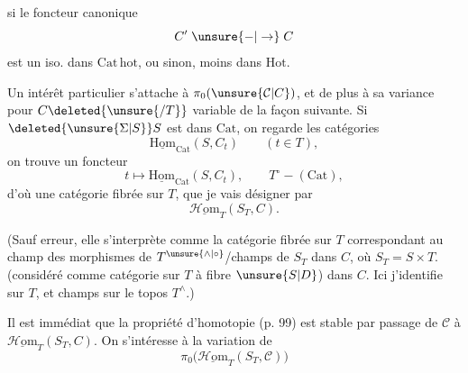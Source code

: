 
si le foncteur canonique
\[
C'\mathrel{\unsure{-|\to}}C
\]
est  un iso. dans $\mathrm{Cat\,hot}$, ou sinon,  moins dans $\mathrm{Hot}$.

Un intérêt particulier s'attache à $\pi_0(\unsure{\mathcal C|C})$, et de plus à sa variance pour $C\deleted{\unsure{/T}}$  variable de la façon suivante. Si $\deleted{\unsure{\Sigma|S}}S$ est dans $\mathrm{Cat}$, on regarde les catégories
\[
\underline{\mathrm{Hom}}_{\mathrm{Cat}}(S,C_t)\qquad(t\in T),
\]
on trouve un foncteur
\[
t\longmapsto\underline{\mathrm{Hom}}_{\mathrm{Cat}}(S,C_t),\qquad T^\circ\mathrel{-}(\mathrm{Cat}),
\]
d'où une catégorie fibrée sur $T$, que je vais désigner par
\[
\underline{\mathscr H\mathrm{om}}_T(S_T,C).
\]

(Sauf erreur, elle s'interprète comme la catégorie fibrée sur $T$ correspondant au champ  des morphismes de $T^{\unsure{\wedge|\circ}}$/champs de $S_T$ dans $C$, où $S_T=S\times T$. (considéré comme catégorie  sur $T$ à fibre   $\unsure{S|D}$) dans $C$. Ici j'identifie  sur $T$, et champs sur le topos $T^\wedge$.)

Il est immédiat que  la propriété d'homotopie (p. 99) est stable par passage de $\mathcal C$ à $\underline{\mathscr H\mathrm{om}}_T(S_T,C)$. On s'intéresse à la variation de
\[
\pi_0\bigl(\underline{\mathscr H\mathrm{om}}_T(S_T,\mathcal C)\bigr)
\]

